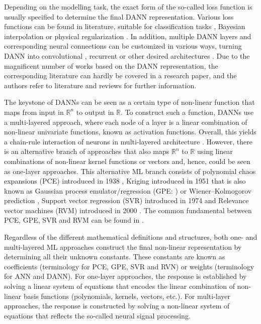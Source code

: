 \documentclass[a4paper,fleqn]{article}
\newcommand{\rw}[1]{\textcolor{blue}{#1}}
\newcommand{\del}[1]{\textcolor{red}{\sout{#1}}}
\renewcommand{\del}[1]{}
\renewcommand{\rw}[1]{#1}
\begin{document}
Depending on the modelling task, the exact form of the so-called loss function \cite{Goodfellow2016deeplearning} is usually specified to determine the final DANN representation. Various loss functions can be found in literature, suitable for classification tasks \cite{ballard1982computervision,krizhevsky2017cnn}, Bayesian interpolation \cite{mackay1992bayesian} or physical regularization \cite{jia2021pgnn,praditia2020thermo}.  In addition, multiple DANN layers and corresponding neural connections can be  customized in various ways, turning DANN into convolutional \cite{buda2018systematic,rawat2017deep}, recurrent \cite{hochreiter1997long,xiao2018nonlinear} or other desired architectures \cite{karim2019multivariate}. Due to the magnificent number of works based on the DANN representation, the corresponding literature can hardly be covered in a research paper, and the authors refer to literature \rw{\cite{hassoun1995fundamentals,graupe2013principles}} and reviews \rw{\cite{bouwmans2019deep,schmidhuber2015deep}} for further information.

The keystone of DANNs can be seen as a certain type of non-linear function that maps from input in $\mathbb{R}^n$ to output in $\mathbb{R}$. To construct such a function, DANNs use a multi-layered approach, where each node of a layer is a linear combination of non-linear \rw{univariate} functions, known as activation functions. Overall, this yields a chain-rule interaction of neurons in multi-layered architecture \cite{anthony2009neural}. However, there is an alternative branch of approaches that also maps $\mathbb{R}^n$ to $\mathbb{R}$ using linear combinations of non-linear kernel functions or vectors and, hence, could be seen as one-layer approaches. This alternative ML branch consists of polynomial chaos expansions (PCE) introduced in 1938 \cite{Wiener1938}, Kriging introduced in 1951 \cite{krige1951statistical} that is also known as Gauss\rw{ian} process emulator/regression (GPE: \cite{williams2006gaussian}) or Wiener–Kolmogorov prediction \cite{cressie1993spatial}, Support vector regression (SVR) introduced in 1974 \cite{vapnik1974theory} and Relevance vector machines (RVM) introduced in 2000 \cite{tipping2000relevance}. The common fundamental between PCE, GPE, SVR and RVM can be found in \cite{KaiSurrogate}. 

Regardless of the different mathematical definitions and structures, both one- and multi-layered ML approaches construct the \del{finil} \rw{final} non-linear representation by determining all their unknown constants. These constants are known as coefficients (terminology for PCE, GPE, SVR and RVN) or weights (terminology for ANN and DANN). For one-layer approaches, the response is established by solving a linear system of equations that encodes the linear combination of non-linear basis functions (polynomials, kernels, vectors, etc.). For multi-layer approaches, the response is constructed by solving a non-linear system of equations that reflects the so-called neural signal processing. 
\end{document}
